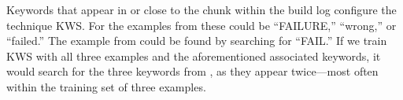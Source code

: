 Keywords that appear in or close to the chunk within
the build log configure the technique KWS\@.
For the examples from  these could be
``FAILURE,'' ``wrong,'' or ``failed.''
The example from  could be found
by searching for ``FAIL.''
If we train KWS with all three examples and the aforementioned
associated keywords, it would search for the three keywords from
, as they appear twice---most often within
the training set of three examples.







